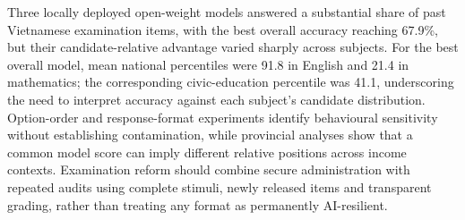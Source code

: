 Three locally deployed open-weight models answered a substantial share of past Vietnamese examination items, with the best overall accuracy reaching 67.9\%, but their candidate-relative advantage varied sharply across subjects. For the best overall model, mean national percentiles were 91.8 in English and 21.4 in mathematics; the corresponding civic-education percentile was 41.1, underscoring the need to interpret accuracy against each subject's candidate distribution. Option-order and response-format experiments identify behavioural sensitivity without establishing contamination, while provincial analyses show that a common model score can imply different relative positions across income contexts. Examination reform should combine secure administration with repeated audits using complete stimuli, newly released items and transparent grading, rather than treating any format as permanently AI-resilient.
